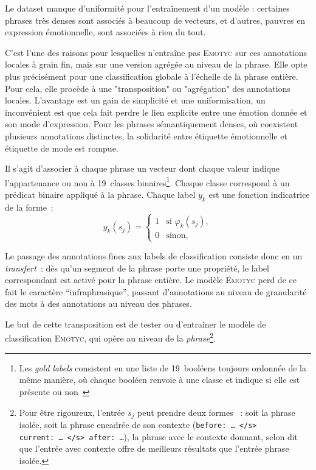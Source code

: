 \documentclass[french, 11pt]{article}
\begin{document}
Le dataset manque d'uniformité pour l'entraînement d'un modèle : certaines phrases très denses sont associés à beaucoup de vecteurs, et d'autres, pauvres en expression émotionnelle, sont associées à rien du tout.

C'est l'une des raisons pour lesquelles \textcite{etienne2023} n'entraîne pas \textsc{Emotyc} sur ces
annotations locales à grain fin, mais sur une version agrégée au niveau
de la phrase.
Elle opte plus précisément pour une classification globale à l'échelle de la phrase entière. Pour cela, elle procède à une "transposition" ou "agrégation" des annotations locales. L'avantage est un gain de simplicité et une uniformisation, un inconvénient est que cela fait perdre le lien explicite entre une émotion donnée et son mode d'expression. Pour les phrases sémantiquement denses, où coexistent plusieurs annotations distinctes, la solidarité entre étiquette émotionnelle et étiquette de mode est rompue.

Il s'agit d'associer à chaque phrase \textcite[p.~135]{etienne2023} un vecteur dont chaque valeur indique l'appartenance ou non à 19~classes binaires\footnote{Les \textit{gold labels} consistent \og en une liste de 19~booléens toujours ordonnée de la même
manière, où chaque booléen renvoie à une classe et indique si elle est
présente ou non~\fg{}}. Chaque classe correspond à un prédicat binaire appliqué à la phrase.
Chaque label $y_k$ est une fonction indicatrice de la forme~:
\[
y_k(s_j) =
\begin{cases}
1 & \text{si } \varphi_k(s_j), \\
0 & \text{sinon,}
\end{cases}
\]




Le passage des annotations fines aux labels de classification consiste
donc en un \emph{transfert}~: dès qu'un segment de la phrase porte une
propriété, le label correspondant est activé pour la phrase entière. Le
modèle \textsc{Emotyc} perd de ce fait le caractère ``infraphrasique'',
passant d'annotations au niveau de granularité des mots à des
annotations au niveau des phrases.

Le but de cette transposition est de tester ou d'entraîner le modèle de classification \textsc{Emotyc}, qui opère au niveau de la \emph{phrase}\footnote{Pour être rigoureux, l'entrée $s_j$
peut prendre deux formes
\parencite[p.~105]{etienne2023}~: soit la phrase isolée, soit la phrase
encadrée de son contexte
(\texttt{before:~\dots\ </s> current:~\dots\ </s> after:~\dots}), la
phrase avec le contexte donnant, selon
\textcite[p.149]{etienne2023} dit que l'entrée avec contexte offre de
meilleurs résultats que l'entrée phrase isolée.}.
\end{document}
